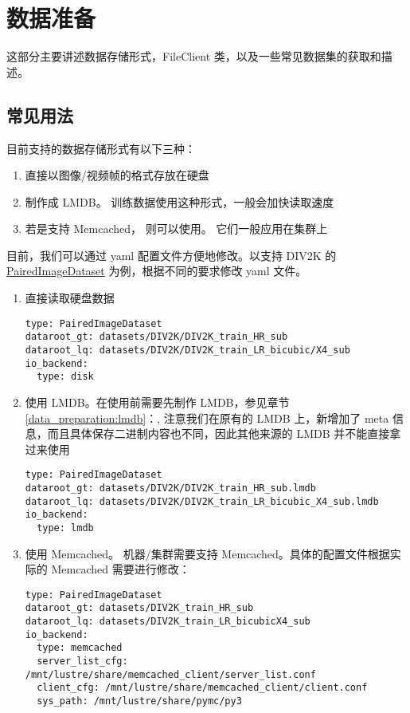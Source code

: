 \documentclass[../main.tex]{subfiles}
\begin{document}
\chapter{数据准备}\label{chapter:data_preparation}
\vspace{-2cm}
这部分主要讲述数据存储形式，FileClient 类，以及一些常见数据集的获取和描述。

\section{常见用法}\label{data_preparation:common_use}

目前支持的数据存储形式有以下三种：

\begin{enumerate}
    \item 直接以图像/视频帧的格式存放在硬盘
    \item 制作成 LMDB。 训练数据使用这种形式，一般会加快读取速度
    \item 若是支持 Memcached， 则可以使用。 它们一般应用在集群上
\end{enumerate}

目前，我们可以通过 yaml 配置文件方便地修改。以支持 DIV2K 的 \href{https://github.com/XPixelGroup/BasicSR/blob/master/basicsr/data/paired_image_dataset.py}{PairedImageDataset} 为例，根据不同的要求修改 yaml 文件。

\begin{enumerate}
    \item 直接读取硬盘数据
          \begin{verbatim}
type: PairedImageDataset
dataroot_gt: datasets/DIV2K/DIV2K_train_HR_sub
dataroot_lq: datasets/DIV2K/DIV2K_train_LR_bicubic/X4_sub
io_backend:
  type: disk
\end{verbatim}

    \item 使用 LMDB。在使用前需要先制作 LMDB，参见章节 \ref{data_preparation:lmdb}：, 注意我们在原有的 LMDB 上，新增加了 meta 信息，而且具体保存二进制内容也不同，因此其他来源的 LMDB 并不能直接拿过来使用
          \begin{verbatim}
type: PairedImageDataset
dataroot_gt: datasets/DIV2K/DIV2K_train_HR_sub.lmdb
dataroot_lq: datasets/DIV2K/DIV2K_train_LR_bicubic_X4_sub.lmdb
io_backend:
  type: lmdb
\end{verbatim}

    \item 使用 Memcached。 机器/集群需要支持 Memcached。具体的配置文件根据实际的 Memcached 需要进行修改：
          \begin{verbatim}
type: PairedImageDataset
dataroot_gt: datasets/DIV2K_train_HR_sub
dataroot_lq: datasets/DIV2K_train_LR_bicubicX4_sub
io_backend:
  type: memcached
  server_list_cfg: /mnt/lustre/share/memcached_client/server_list.conf
  client_cfg: /mnt/lustre/share/memcached_client/client.conf
  sys_path: /mnt/lustre/share/pymc/py3
\end{verbatim}
\end{enumerate}
\end{document}
